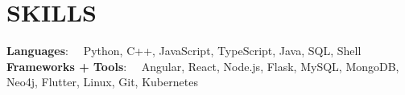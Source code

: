 \documentclass[letterpaper,10pt]{article}
\begin{document}
\section{SKILLS}
 \begin{itemize}[leftmargin=0in, label={}]
    \small{\item{
     \textbf{\hspace{12.5mm}  Languages}{: \ \ Python, C++, JavaScript, TypeScript, Java, SQL, Shell} \\
     \textbf{Frameworks + Tools}{: \ \ Angular, React, Node.js, Flask, MySQL, MongoDB, Neo4j, Flutter, Linux, Git, Kubernetes}}}
 \end{itemize}

\end{document}
